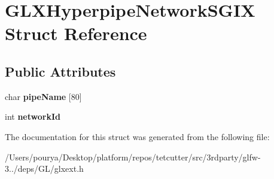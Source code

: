 \hypertarget{structGLXHyperpipeNetworkSGIX}{}\section{G\+L\+X\+Hyperpipe\+Network\+S\+G\+I\+X Struct Reference}
\label{structGLXHyperpipeNetworkSGIX}
\subsection*{Public Attributes}
\begin{DoxyCompactItemize}
\item 
\hypertarget{structGLXHyperpipeNetworkSGIX_a91dc68bdd22c2a458ecb58037cd085bd}{}char {\bfseries pipe\+Name} \mbox{[}80\mbox{]}\label{structGLXHyperpipeNetworkSGIX_a91dc68bdd22c2a458ecb58037cd085bd}

\item 
\hypertarget{structGLXHyperpipeNetworkSGIX_a81393053988b32fadb0b21615024add1}{}int {\bfseries network\+Id}\label{structGLXHyperpipeNetworkSGIX_a81393053988b32fadb0b21615024add1}

\end{DoxyCompactItemize}


The documentation for this struct was generated from the following file\+:\begin{DoxyCompactItemize}
\item 
/\+Users/pourya/\+Desktop/platform/repos/tetcutter/src/3rdparty/glfw-\/3../deps/\+G\+L/glxext.\+h\end{DoxyCompactItemize}
